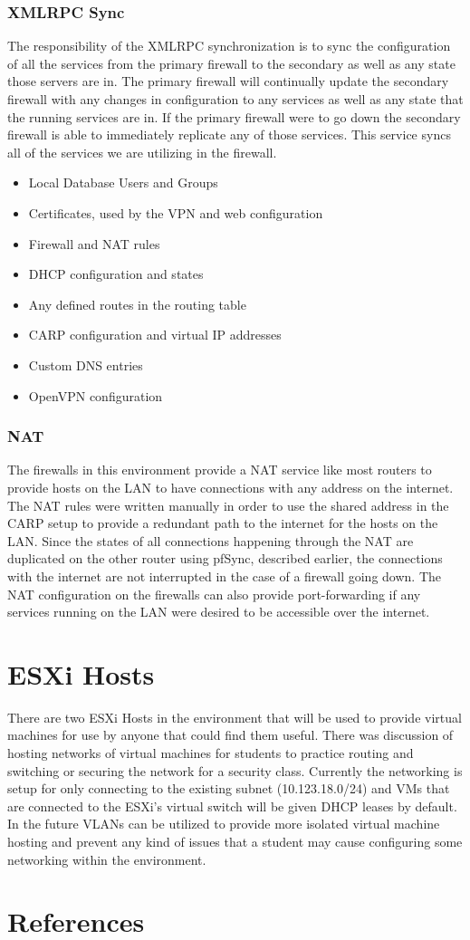 \documentclass[12pt]{IEEEtran}
\begin{document}
\subsubsection{XMLRPC Sync}
The responsibility of the XMLRPC synchronization is to sync the configuration of all the services from the primary firewall to the secondary as well as any state those servers are in.
The primary firewall will continually update the secondary firewall with any changes in configuration to any services as well as any state that the running services are in.
If the primary firewall were to go down the secondary firewall is able to immediately replicate any of those services. 
This service syncs all of the services we are utilizing in the firewall. 
\begin{itemize}
\item Local Database Users and Groups
\item Certificates, used by the VPN and web configuration
\item Firewall and NAT rules
\item DHCP configuration and states
\item Any defined routes in the routing table
\item CARP configuration and virtual IP addresses
\item Custom DNS entries
\item OpenVPN configuration
\end{itemize}

\subsubsection{NAT}
The firewalls in this environment provide a NAT service like most routers to provide hosts on the LAN to have connections with any address on the internet. 
The NAT rules were written manually in order to use the shared address in the CARP setup to provide a redundant path to the internet for the hosts on the LAN.
Since the states of all connections happening through the NAT are duplicated on the other router using pfSync, described earlier, the connections with the internet are not interrupted in the case of a firewall going down. 
The NAT configuration on the firewalls can also provide port-forwarding if any services running on the LAN were desired to be accessible over the internet.  

\section{ESXi Hosts}
There are two ESXi Hosts in the environment that will be used to provide virtual machines for use by anyone that could find them useful. 
There was discussion of hosting networks of virtual machines for students to practice routing and switching or securing the network for a security class. 
Currently the networking is setup for only connecting to the existing subnet (10.123.18.0/24) and VMs that are connected to the ESXi's virtual switch will be given DHCP leases by default. 
In the future VLANs can be utilized to provide more isolated virtual machine hosting and prevent any kind of issues that a student may cause configuring some networking within the environment.

\newpage \section{References} \printbibliography[heading=none]
\end{document}
